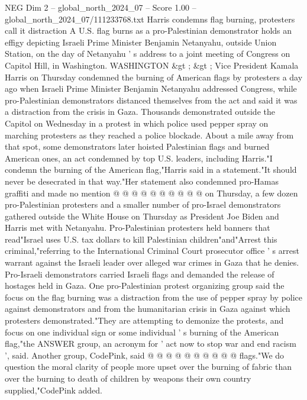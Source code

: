 \begin{textsample}{NEG Dim 2 – global\_north\_2024\_07 – Score 1.00 – global\_north\_2024\_07/111233768.txt}  \label{ex:f2_neg_262}
Harris condemns flag burning, protesters call it distraction A U.S. flag burns as a pro-Palestinian demonstrator holds an effigy depicting Israeli Prime Minister Benjamin Netanyahu, outside Union Station, on the day of Netanyahu ' s address to a joint meeting of Congress on Capitol Hill, in Washington.
WASHINGTON \&gt ; \&gt ; Vice President Kamala Harris on Thursday condemned the burning of American flags by protesters a day ago when Israeli Prime Minister Benjamin Netanyahu addressed Congress, while pro-Palestinian demonstrators distanced themselves from the act and said it was a distraction from the crisis in Gaza.
Thousands demonstrated outside the Capitol on Wednesday in a protest in which police used pepper spray on marching protesters as they reached a police blockade.
About a mile away from that spot, some demonstrators later hoisted Palestinian flags and burned American ones, an act condemned by top U.S. leaders, including Harris."I condemn the burning of the American flag,"Harris said in a statement."It should never be desecrated in that way."Her statement also condemned pro-Hamas graffiti and made no mention @ @ @ @ @ @ @ @ @ @ on Thursday, a few dozen pro-Palestinian protesters and a smaller number of pro-Israel demonstrators gathered outside the White House on Thursday as President Joe Biden and Harris met with Netanyahu.
Pro-Palestinian protesters held banners that read"Israel uses U.S. tax dollars to kill Palestinian children"and"Arrest this criminal,"referring to the International Criminal Court prosecutor office ' s arrest warrant against the Israeli leader over alleged war crimes in Gaza that he denies.
Pro-Israeli demonstrators carried Israeli flags and demanded the release of hostages held in Gaza.
One pro-Palestinian protest organizing group said the focus on the flag burning was a distraction from the use of pepper spray by police against demonstrators and from the humanitarian crisis in Gaza against which protesters demonstrated."They are attempting to demonize the protests, and focus on one individual sign or some individual ' s burning of the American flag,"the ANSWER group, an acronym for ' act now to stop war and end racism ', said.
Another group, CodePink, said @ @ @ @ @ @ @ @ @ @ flags."We do question the moral clarity of people more upset over the burning of fabric than over the burning to death of children by weapons their own country supplied,"CodePink added.

\end{textsample}
